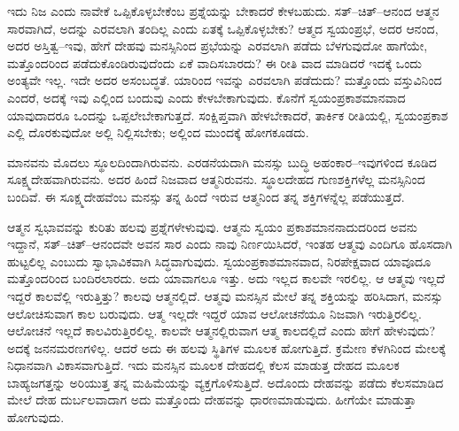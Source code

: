 ಇದು ನಿಜ ಎಂದು ನಾವೇಕೆ ಒಪ್ಪಿಕೊಳ್ಳಬೇಕೆಂಬ ಪ್ರಶ್ನೆಯನ್ನು ಬೇಕಾದರೆ ಕೇಳಬಹುದು. ಸತ್​–ಚಿತ್​–ಆನಂದ ಆತ್ಮನ ಸಾರವಾಗಿದೆ, ಅದನ್ನು ಎರವಲಾಗಿ ತಂದಿಲ್ಲ ಎಂದು ಏತಕ್ಕೆ ಒಪ್ಪಿಕೊಳ್ಳಬೇಕು? ಆತ್ಮದ ಸ್ವಯಂಪ್ರಭೆ, ಅದರ ಆನಂದ, ಅದರ ಅಸ್ತಿತ್ವ–ಇವು, ಹೇಗೆ ದೇಹವು ಮನಸ್ಸಿನಿಂದ ಪ್ರಭೆಯನ್ನು ಎರವಲಾಗಿ ಪಡೆದು ಬೆಳಗುವುದೋ ಹಾಗೆಯೇ, ಮತ್ತೊಂದರಿಂದ ಪಡೆದುಕೊಂಡಿರುವುದೆಂದು ಏಕೆ ವಾದಿಸಬಾರದು? ಈ ರೀತಿ ವಾದ ಮಾಡಿದರೆ ಇದಕ್ಕೆ ಒಂದು ಅಂತ್ಯವೇ ಇಲ್ಲ. ಇದೇ ಅದರ ಅಸಂಬದ್ಧತೆ. ಯಾರಿಂದ ಇವನ್ನು ಎರವಲಾಗಿ ಪಡೆದುದು? ಮತ್ತೊಂದು ವಸ್ತುವಿನಿಂದ ಎಂದರೆ, ಅದಕ್ಕೆ ಇವು ಎಲ್ಲಿಂದ ಬಂದುವು ಎಂದು ಕೇಳಬೇಕಾಗುವುದು. ಕೊನೆಗೆ ಸ್ವಯಂಪ್ರಕಾಶಮಾನವಾದ ಯಾವುದಾದರೂ ಒಂದನ್ನು ಒಪ್ಪಲೇಬೇಕಾಗುತ್ತದೆ. ಸಂಕ್ಷಿಪ್ತವಾಗಿ ಹೇಳಬೇಕಾದರೆ, ತಾರ್ಕಿಕ ರೀತಿಯಲ್ಲಿ, ಸ್ವಯಂಪ್ರಕಾಶ ಎಲ್ಲಿ ದೊರಕುವುದೋ ಅಲ್ಲಿ ನಿಲ್ಲಿಸಬೇಕು; ಅಲ್ಲಿಂದ ಮುಂದಕ್ಕೆ ಹೋಗಕೂಡದು.


ಮಾನವನು ಮೊದಲು ಸ್ಥೂಲದಿಂದಾಗಿರುವನು. ಎರಡನೆಯದಾಗಿ ಮನಸ್ಸು ಬುದ್ಧಿ ಅಹಂಕಾರ–ಇವುಗಳಿಂದ ಕೂಡಿದ ಸೂಕ್ಷ್ಮದೇಹವಾಗಿರುವನು. ಅದರ ಹಿಂದೆ ನಿಜವಾದ ಆತ್ಮನಿರುವನು. ಸ್ಥೂಲದೇಹದ ಗುಣಶಕ್ತಿಗಳೆಲ್ಲ ಮನಸ್ಸಿನಿಂದ ಬಂದಿವೆ. ಈ ಸೂಕ್ಷ್ಮದೇಹವೆಂಬ ಮನಸ್ಸು ತನ್ನ ಹಿಂದೆ ಇರುವ ಆತ್ಮನಿಂದ ತನ್ನ ಶಕ್ತಿಗಳನ್ನೆಲ್ಲ ಪಡೆಯುತ್ತದೆ.

ಆತ್ಮನ ಸ್ವಭಾವವನ್ನು ಕುರಿತು ಹಲವು ಪ್ರಶ್ನೆಗಳೇಳುವುವು. ಆತ್ಮನು ಸ್ವಯಂ ಪ್ರಕಾಶಮಾನನಾದುದರಿಂದ ಅವನು ಇದ್ದಾನೆ, ಸತ್​–ಚಿತ್​–ಆನಂದವೇ ಅವನ ಸಾರ ಎಂದು ನಾವು ನಿರ್ಣಯಿಸಿದರೆ, ಇಂತಹ ಆತ್ಮವು ಎಂದಿಗೂ ಹೊಸದಾಗಿ ಹುಟ್ಟಲಿಲ್ಲ ಎಂಬುದು ಸ್ವಾಭಾವಿಕವಾಗಿ ಸಿದ್ಧವಾಗುವುದು. ಸ್ವಯಂಪ್ರಕಾಶಮಾನವಾದ, ನಿರಪೇಕ್ಷವಾದ ಯಾವೂದೂ ಮತ್ತೊಂದರಿಂದ ಬಂದಿರಲಾರದು. ಅದು ಯಾವಾಗಲೂ ಇತ್ತು. ಅದು ಇಲ್ಲದ ಕಾಲವೇ ಇರಲಿಲ್ಲ. ಆ ಆತ್ಮವು ಇಲ್ಲದೆ ಇದ್ದರೆ ಕಾಲವೆಲ್ಲಿ ಇರುತ್ತಿತ್ತು? ಕಾಲವು ಆತ್ಮನಲ್ಲಿದೆ. ಆತ್ಮವು ಮನಸ್ಸಿನ ಮೇಲೆ ತನ್ನ ಶಕ್ತಿಯನ್ನು ಹರಿಸಿದಾಗ, ಮನಸ್ಸು ಆಲೋಚಿಸುವಾಗ ಕಾಲ ಬರುವುದು. ಆತ್ಮ ಇಲ್ಲದೇ ಇದ್ದರೆ ಯಾವ ಆಲೋಚನೆಯೂ ನಿಜವಾಗಿ ಇರುತ್ತಿರಲಿಲ್ಲ. ಆಲೋಚನೆ ಇಲ್ಲದೆ ಕಾಲವಿರುತ್ತಿರಲಿಲ್ಲ. ಕಾಲವೇ ಆತ್ಮನಲ್ಲಿರುವಾಗ ಆತ್ಮ ಕಾಲದಲ್ಲಿದೆ ಎಂದು ಹೇಗೆ ಹೇಳುವುದು? ಅದಕ್ಕೆ ಜನನಮರಣಗಳಿಲ್ಲ. ಆದರೆ ಅದು ಈ ಹಲವು ಸ್ಥಿತಿಗಳ ಮೂಲಕ ಹೋಗುತ್ತಿದೆ. ಕ್ರಮೇಣ ಕೆಳಗಿನಿಂದ ಮೇಲಕ್ಕೆ ನಿಧಾನವಾಗಿ ವಿಕಾಸವಾಗುತ್ತಿದೆ. ಇದು ಮನಸ್ಸಿನ ಮೂಲಕ ದೇಹದಲ್ಲಿ ಕೆಲಸ ಮಾಡುತ್ತ ದೇಹದ ಮೂಲಕ ಬಾಹ್ಯಜಗತ್ತನ್ನು ಅರಿಯುತ್ತ ತನ್ನ ಮಹಿಮೆಯನ್ನು ವ್ಯಕ್ತಗೊಳಿಸುತ್ತಿದೆ. ಅದೊಂದು ದೇಹವನ್ನು ಪಡೆದು ಕೆಲಸಮಾಡಿದ ಮೇಲೆ ದೇಹ ದುರ್ಬಲವಾದಾಗ ಅದು ಮತ್ತೊಂದು ದೇಹವನ್ನು ಧಾರಣಮಾಡುವುದು. ಹೀಗೆಯೇ ಮಾಡುತ್ತಾ ಹೋಗುವುದು.

